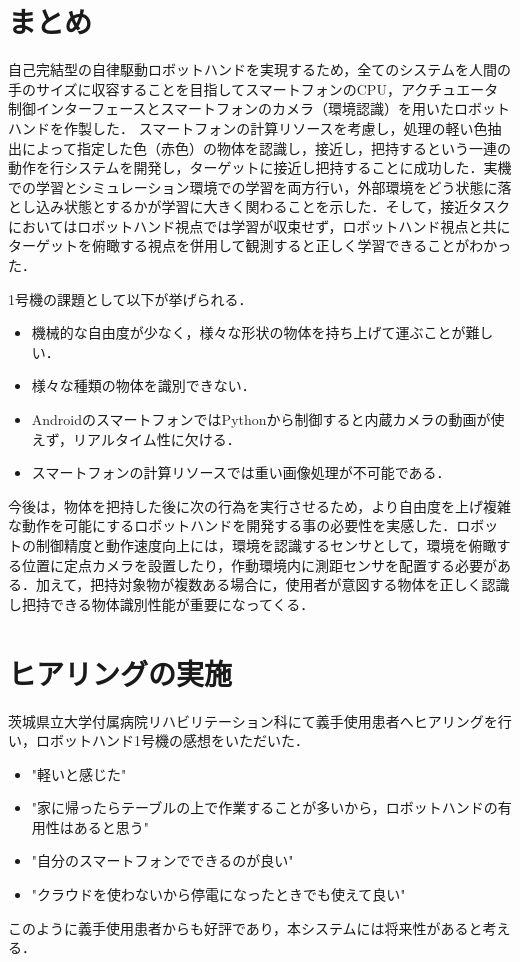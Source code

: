 \section{まとめ}
自己完結型の自律駆動ロボットハンドを実現するため，全てのシステムを人間の手のサイズに収容することを目指してスマートフォンのCPU，アクチュエータ制御インターフェースとスマートフォンのカメラ（環境認識）を用いたロボットハンドを作製した．
スマートフォンの計算リソースを考慮し，処理の軽い色抽出によって指定した色（赤色）の物体を認識し，接近し，把持するという一連の動作を行システムを開発し，ターゲットに接近し把持することに成功した．実機での学習とシミュレーション環境での学習を両方行い，外部環境をどう状態に落とし込み状態とするかが学習に大きく関わることを示した．そして，接近タスクにおいてはロボットハンド視点では学習が収束せず，ロボットハンド視点と共にターゲットを俯瞰する視点を併用して観測すると正しく学習できることがわかった．

1号機の課題として以下が挙げられる．
\begin{itemize}
    \item 機械的な自由度が少なく，様々な形状の物体を持ち上げて運ぶことが難しい．
    \item 様々な種類の物体を識別できない．
    \item AndroidのスマートフォンではPythonから制御すると内蔵カメラの動画が使えず，リアルタイム性に欠ける．
    \item スマートフォンの計算リソースでは重い画像処理が不可能である．
\end{itemize}

今後は，物体を把持した後に次の行為を実行させるため，より自由度を上げ複雑な動作を可能にするロボットハンドを開発する事の必要性を実感した．ロボットの制御精度と動作速度向上には，環境を認識するセンサとして，環境を俯瞰する位置に定点カメラを設置したり，作動環境内に測距センサを配置する必要がある．加えて，把持対象物が複数ある場合に，使用者が意図する物体を正しく認識し把持できる物体識別性能が重要になってくる．


\section{ヒアリングの実施}
茨城県立大学付属病院リハビリテーション科にて義手使用患者へヒアリングを行い，ロボットハンド1号機の感想をいただいた．
\begin{itemize}
    \item "軽いと感じた"
    \item "家に帰ったらテーブルの上で作業することが多いから，ロボットハンドの有用性はあると思う"
    \item "自分のスマートフォンでできるのが良い"
    \item "クラウドを使わないから停電になったときでも使えて良い"
\end{itemize}
このように義手使用患者からも好評であり，本システムには将来性があると考える．
